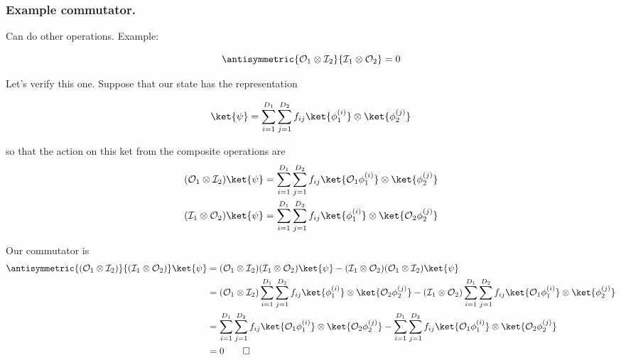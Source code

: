\subsubsection{Example commutator.}

Can do other operations.  Example:

\begin{equation}\label{eqn:qmTwoL1:310}
\antisymmetric{ \mathcal{O}_1 \otimes \mathcal{I}_2 }{ \mathcal{I}_1 \otimes \mathcal{O}_2 } = 0
\end{equation}

Let's verify this one.  Suppose that our state has the representation

\begin{equation}\label{eqn:qmTwoL1:330}
\ket{\psi} 
= 
\sum_{i = 1}^{D_1}
\sum_{j = 1}^{D_2}
f_{ij}
\ket{ \phi_1^{(i)}} \otimes \ket{ \phi_2^{(j)}}
\end{equation}

so that the action on this ket from the composite operations are
\begin{align}\label{eqn:qmTwoL1:350}
(\mathcal{O}_1 \otimes \mathcal{I}_2)
\ket{\psi} 
&= 
\sum_{i = 1}^{D_1}
\sum_{j = 1}^{D_2}
f_{ij}
\ket{ \mathcal{O}_1 \phi_1^{(i)}} \otimes \ket{ \phi_2^{(j)}} \\
(\mathcal{I}_1 \otimes \mathcal{O}_2)
\ket{\psi} 
&= 
\sum_{i = 1}^{D_1}
\sum_{j = 1}^{D_2}
f_{ij}
\ket{ \phi_1^{(i)}} \otimes \ket{ \mathcal{O}_2 \phi_2^{(j)}}
\end{align}

Our commutator is
\begin{align*}
\antisymmetric{(\mathcal{O}_1 \otimes \mathcal{I}_2)}{(\mathcal{I}_1 \otimes \mathcal{O}_2)}
\ket{\psi} 
&=
(\mathcal{O}_1 \otimes \mathcal{I}_2)(\mathcal{I}_1 \otimes \mathcal{O}_2) 
\ket{\psi} 
-(\mathcal{I}_1 \otimes \mathcal{O}_2)(\mathcal{O}_1 \otimes \mathcal{I}_2)
\ket{\psi}  \\
&=
(\mathcal{O}_1 \otimes \mathcal{I}_2)
\sum_{i = 1}^{D_1}
\sum_{j = 1}^{D_2}
f_{ij}
\ket{ \phi_1^{(i)}} \otimes \ket{ \mathcal{O}_2 \phi_2^{(j)}}
-(\mathcal{I}_1 \otimes \mathcal{O}_2)
\sum_{i = 1}^{D_1}
\sum_{j = 1}^{D_2}
f_{ij}
\ket{ \mathcal{O}_1 \phi_1^{(i)}} \otimes \ket{ \phi_2^{(j)}} \\
&=
\sum_{i = 1}^{D_1}
\sum_{j = 1}^{D_2}
f_{ij}
\ket{ \mathcal{O}_1 \phi_1^{(i)}} \otimes \ket{ \mathcal{O}_2 \phi_2^{(j)}}
-
\sum_{i = 1}^{D_1}
\sum_{j = 1}^{D_2}
f_{ij}
\ket{ \mathcal{O}_1 \phi_1^{(i)}} \otimes \ket{ \mathcal{O}_2 \phi_2^{(j)}} \\
&=
0 \qquad \square
\end{align*}

